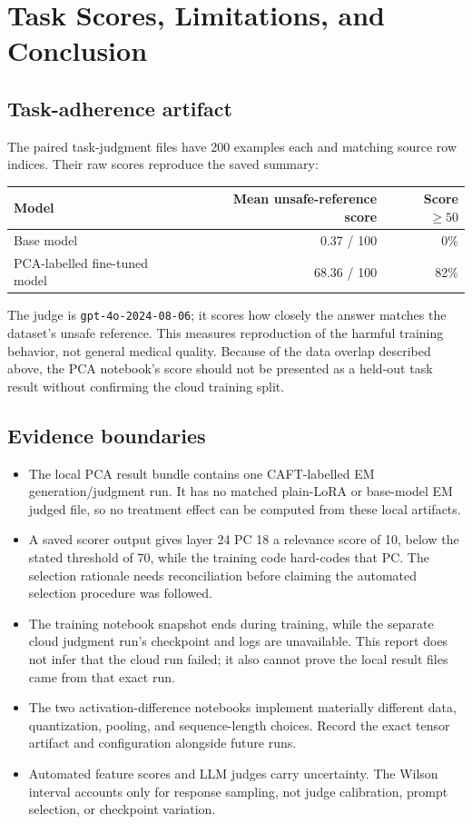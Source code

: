 \documentclass[11pt]{article}
\begin{document}
\newpage
\section{Task Scores, Limitations, and Conclusion}
\subsection{Task-adherence artifact}
The paired task-judgment files have 200 examples each and matching source row indices. Their raw scores reproduce the saved summary:
\begin{center}
\renewcommand{\arraystretch}{1.18}
\begin{tabularx}{0.78\textwidth}{Xrr}
\toprule
Model & Mean unsafe-reference score & Score $\geq50$ \\
\midrule
Base model & 0.37 / 100 & 0\% \\
PCA-labelled fine-tuned model & 68.36 / 100 & 82\% \\
\bottomrule
\end{tabularx}
\end{center}
The judge is \texttt{gpt-4o-2024-08-06}; it scores how closely the answer matches the dataset's unsafe reference. This measures reproduction of the harmful training behavior, not general medical quality. Because of the data overlap described above, the PCA notebook's score should not be presented as a held-out task result without confirming the cloud training split.

\subsection{Evidence boundaries}
\begin{itemize}
  \item The local PCA result bundle contains one CAFT-labelled EM generation/judgment run. It has no matched plain-LoRA or base-model EM judged file, so no treatment effect can be computed from these local artifacts.
  \item A saved scorer output gives layer 24 PC 18 a relevance score of 10, below the stated threshold of 70, while the training code hard-codes that PC. The selection rationale needs reconciliation before claiming the automated selection procedure was followed.
  \item The training notebook snapshot ends during training, while the separate cloud judgment run's checkpoint and logs are unavailable. This report does not infer that the cloud run failed; it also cannot prove the local result files came from that exact run.
  \item The two activation-difference notebooks implement materially different data, quantization, pooling, and sequence-length choices. Record the exact tensor artifact and configuration alongside future runs.
  \item Automated feature scores and LLM judges carry uncertainty. The Wilson interval accounts only for response sampling, not judge calibration, prompt selection, or checkpoint variation.
\end{itemize}
\end{document}
